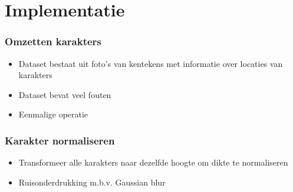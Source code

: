 \documentclass{beamer}
\begin{document}
    \section{Implementatie}

    \begin{frame}
        \frametitle{Omzetten karakters}

        \begin{itemize}
            \item Dataset bestaat uit foto's van kentekens met informatie over
            locaties van karakters
            \item Dataset bevat veel fouten
            \item Eenmalige operatie
        \end{itemize}
    \end{frame}

    \begin{frame}
        \frametitle{Karakter normaliseren}

        \begin{itemize}
            \item Transformeer alle karakters naar dezelfde hoogte om dikte te
            normaliseren
            \item Ruisonderdrukking m.b.v. Gaussian blur
        \end{itemize}
    \end{frame}
\end{document}

